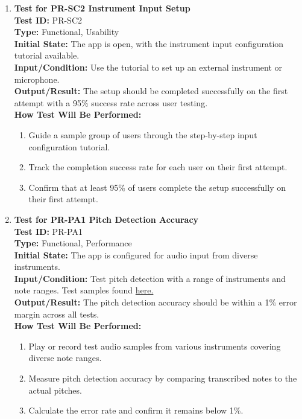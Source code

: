 \documentclass[12pt, titlepage]{article}
\begin{document}
\begin{enumerate}
    \item \textbf{Test for PR-SC2 Instrument Input Setup} \\
      \newline
      \textbf{Test ID:} PR-SC2 \\
      \textbf{Type:} Functional, Usability \\
      \textbf{Initial State:} The app is open, with the instrument input configuration tutorial available. \\
      \textbf{Input/Condition:} Use the tutorial to set up an external instrument or microphone. \\
      \textbf{Output/Result:} The setup should be completed successfully on the first attempt with a 95\% success rate across 
      user testing. \\
      \textbf{How Test Will Be Performed:}
      \begin{enumerate}
          \item Guide a sample group of users through the step-by-step input configuration tutorial.
          \item Track the completion success rate for each user on their first attempt.
          \item Confirm that at least 95\% of users complete the setup successfully on their first attempt.
      \end{enumerate}

    \item \textbf{Test for PR-PA1 Pitch Detection Accuracy} \\
      \newline
      \textbf{Test ID:} PR-PA1 \\
      \textbf{Type:} Functional, Performance \\
      \textbf{Initial State:} The app is configured for audio input from diverse instruments. \\
      \textbf{Input/Condition:} Test pitch detection with a range of instruments and note ranges. Test samples found 
      \href{https://github.com/emilyperica/ScoreGen/tree/main/test/TestingDatasets}{here.}\\
      \textbf{Output/Result:} The pitch detection accuracy should be within a 1\% error margin across all tests. \\
      \textbf{How Test Will Be Performed:}
      \begin{enumerate}
          \item Play or record test audio samples from various instruments covering diverse note ranges.
          \item Measure pitch detection accuracy by comparing transcribed notes to the actual pitches.
          \item Calculate the error rate and confirm it remains below 1\%.
      \end{enumerate}


\end{enumerate}
\end{document}
